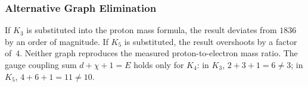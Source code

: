 \documentclass[11pt,a4paper]{book}
\begin{document}
\begin{code}
\\
\>[0][@{}l@{\AgdaIndent{0}}]%
\>[2]\AgdaSymbol{\{}\AgdaSpace{}%
\AgdaSpace{}%
\AgdaSymbol{=}\AgdaSpace{}%
\<%
\\
%
\>[2]\AgdaSymbol{;}\AgdaSpace{}%
\AgdaSpace{}%
\AgdaSymbol{=}\AgdaSpace{}%
\<%
\\
%
\>[2]\AgdaSymbol{;}\AgdaSpace{}%
\AgdaSpace{}%
\AgdaSymbol{=}\AgdaSpace{}%
\<%
\\
%
\>[2]\AgdaSymbol{;}\AgdaSpace{}%
\AgdaSpace{}%
\AgdaSymbol{=}\AgdaSpace{}%
\<%
\\
%
\>[2]\AgdaSymbol{;}\AgdaSpace{}%
\AgdaSpace{}%
\AgdaSymbol{=}\AgdaSpace{}%
\AgdaSpace{}%
\AgdaSymbol{\}}\<%
\end{code}

\subsubsection*{Alternative Graph Elimination}

If $K_3$ is substituted into the proton mass formula, the result deviates
from $1836$ by an order of magnitude.  If $K_5$ is substituted, the result
overshoots by a factor of~$4$.  Neither graph reproduces the measured
proton-to-electron mass ratio.  The gauge coupling sum $d + \chi + 1 = E$
holds only for $K_4$: in $K_3$, $2 + 3 + 1 = 6 \neq 3$; in $K_5$,
$4 + 6 + 1 = 11 \neq 10$.
\end{document}
